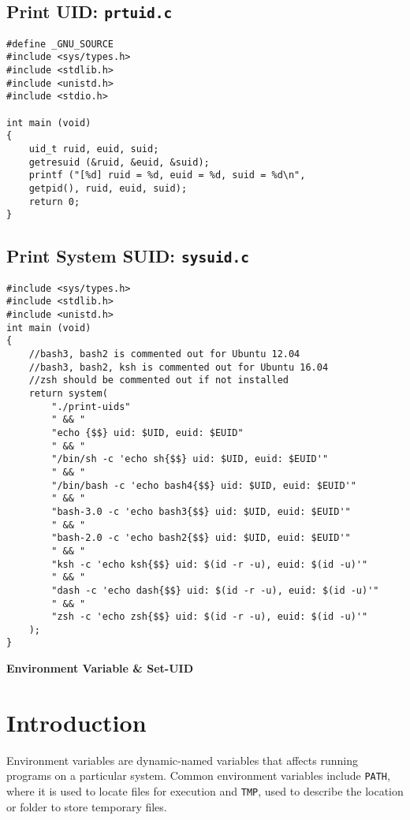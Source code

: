 \documentclass[a4paper,12pt]{article}
\begin{document}
\subsection{Print UID: \texttt{prtuid.c}}
\label{addnotes}
\begin{verbatim}
#define _GNU_SOURCE
#include <sys/types.h>
#include <stdlib.h>
#include <unistd.h>
#include <stdio.h>

int main (void)
{
    uid_t ruid, euid, suid;
    getresuid (&ruid, &euid, &suid);
    printf ("[%d] ruid = %d, euid = %d, suid = %d\n",
    getpid(), ruid, euid, suid);
    return 0;
}
\end{verbatim}
\newpage
\subsection{Print System SUID: \texttt{sysuid.c}}
\begin{verbatim}
#include <sys/types.h>
#include <stdlib.h>
#include <unistd.h>
int main (void)
{
    //bash3, bash2 is commented out for Ubuntu 12.04
    //bash3, bash2, ksh is commented out for Ubuntu 16.04
    //zsh should be commented out if not installed
    return system(
        "./print-uids"
        " && "
        "echo {$$} uid: $UID, euid: $EUID"
        " && "
        "/bin/sh -c 'echo sh{$$} uid: $UID, euid: $EUID'"
        " && "
        "/bin/bash -c 'echo bash4{$$} uid: $UID, euid: $EUID'"
        " && "
        "bash-3.0 -c 'echo bash3{$$} uid: $UID, euid: $EUID'"
        " && "
        "bash-2.0 -c 'echo bash2{$$} uid: $UID, euid: $EUID'"
        " && "
        "ksh -c 'echo ksh{$$} uid: $(id -r -u), euid: $(id -u)'"
        " && "
        "dash -c 'echo dash{$$} uid: $(id -r -u), euid: $(id -u)'"
        " && "
        "zsh -c 'echo zsh{$$} uid: $(id -r -u), euid: $(id -u)'"
    );
}
\end{verbatim}
	
\begin{titlepage}
	\begin{center}
		\vspace*{27em}
		\Huge
		\textbf{Environment Variable \& Set-UID\\}		
		\vfill
	\end{center}
\end{titlepage}
\newpage
{}
\setcounter{section}{0}
\section{Introduction}
Environment variables are dynamic-named variables that affects running programs on a particular system. Common environment variables include \texttt{PATH}, where it is used to locate files for execution and \texttt{TMP}, used to describe the location or folder to store temporary files.
\end{document}
